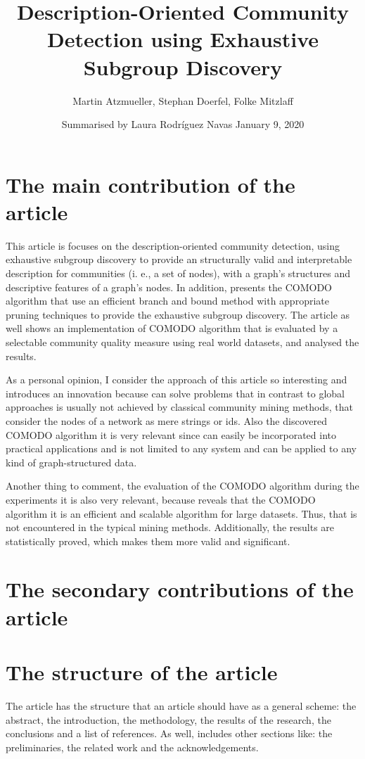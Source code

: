 \documentclass[a4paper]{article}
\title{Description-Oriented Community Detection using Exhaustive Subgroup Discovery}
\date{Summarised by Laura Rodríguez Navas \vskip 0.35cm January 9, 2020}
\author{Martin Atzmueller, Stephan Doerfel, Folke Mitzlaff}
\begin{document}
	
\maketitle

\section*{The main contribution of the article}
This article is focuses on the description-oriented community detection, using exhaustive subgroup discovery to provide an structurally valid and interpretable description for communities (i. e., a set of nodes), with a graph's structures and descriptive features of a graph’s nodes. In addition, presents the COMODO algorithm that use an efficient branch and bound method with appropriate pruning techniques to provide the exhaustive subgroup discovery. The article as well shows an implementation of COMODO algorithm that is evaluated by a selectable community quality measure using real world datasets, and analysed the results.
\vskip 0.35cm

As a personal opinion, I consider the approach of this article so interesting and introduces an innovation because can solve problems that in contrast to global approaches is usually not achieved by classical community mining methods, that consider the nodes of a network as mere strings or ids. Also the discovered COMODO algorithm it is very relevant since can easily be incorporated into practical applications and is not limited to any system and can be applied to any kind of graph-structured data.
\vskip 0.35cm

Another thing to comment, the evaluation of the COMODO algorithm during the experiments it is also very relevant, because reveals that the COMODO algorithm it is an efficient and scalable algorithm for large datasets. Thus, that is not encountered in the typical mining methods. Additionally, the results are statistically proved, which makes them more valid and significant.

\section*{The secondary contributions of the article}	

\section*{The structure of the article}
The article has the structure that an article should have as a general scheme: the abstract, the introduction, the methodology, the results of the research, the conclusions and a list of references. As well, includes other sections like: the preliminaries, the related work and the acknowledgements.
\vskip 0.35cm
\end{document}
